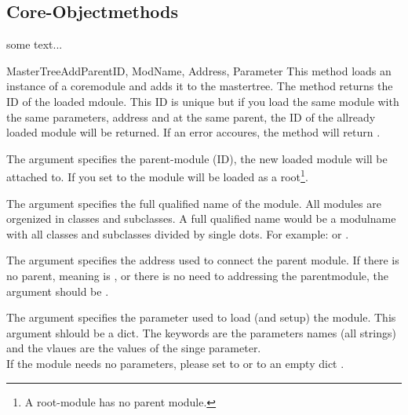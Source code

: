 \subsection{Core-Objectmethods}
\label{core-objects}

some text...

\begin{methoddesc}[Core]{MasterTreeAdd}{ParentID, ModName, Address, Parameter}
This method loads an instance of a coremodule and adds it to the mastertree. The method returns the ID of the loaded mdoule. 
This ID is unique but if you load the same module with the same parameters, address and at the same parent, the 
ID of the allready loaded module will be returned. If an error accoures, the method will return .

The argument  specifies the parent-module (ID), the new loaded module will be attached to. If you set 
 to  the module will be loaded as a root\footnote{A root-module has no parent module.}. 

The argument  specifies the full qualified name of the module. All modules are orgenized in classes and
subclasses. A full qualified name would be a modulname with all classes and subclasses divided by single dots. 
For example:  or .

The argument  specifies the address used to connect the parent module. If there is no parent, meaning 
 is , or there is no need to addressing the parentmodule, the argument  should be 
.

The argument  specifies the parameter used to load (and setup) the module. This argument shlould be a dict. 
The keywords are the parameters names (all strings) and the vlaues are the values of the singe parameter. \\
 If the module needs no parameters, please set  to 
or to an empty dict \code{\{\}}.
\end{methoddesc}




